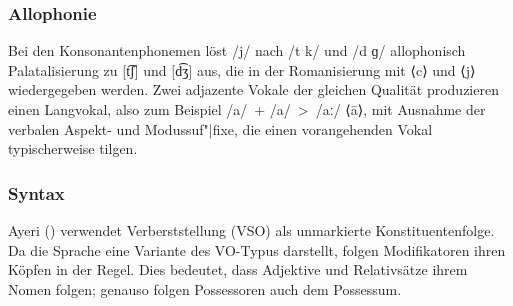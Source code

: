 \documentclass[
	12pt,
	ngerman,
]{scrartcl}
\let\q\textquote
\newcommand{\zwsp}{\mbox{​}} %
\newcommand{\ayr}[1]{\zwsp\smash{{\Tagati #1}}} %
\newcommand{\xayr}[3]{\zwsp\smash{\Tagati #1} \emph{#2} `#3'} %
\begin{document}
\subsubsection{Allophonie}

Bei den Konsonantenphonemen löst /j/ nach /t k/ und /d ɡ/ allophonisch
Palatalisierung zu [t͡ʃ] und [d͡ʒ] aus, die in der Romanisierung mit ⟨c⟩ und
⟨j⟩ wiedergegeben werden.
Zwei adjazente Vokale der gleichen Qualität produzieren einen Langvokal, also
zum Beispiel /a/~+ /a/~>~/aː/ ⟨ā⟩, mit Ausnahme der verbalen Aspekt- und
Modussuf"|fixe, die einen vorangehenden Vokal typischerweise tilgen.

\subsubsection{Syntax}

Ayeri (\mbox{\ayr{Ayeri}}) verwendet Verberststellung (VSO) als unmarkierte
Konstituentenfolge. Da die Sprache eine Variante des VO-Typus darstellt, folgen
Modifikatoren ihren Köpfen in der Regel. Dies bedeutet, dass Adjektive und
Relativsätze ihrem Nomen folgen; genauso folgen Possessoren auch dem Possessum.


\end{document}
